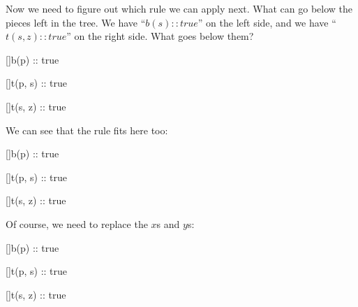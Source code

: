 \documentclass[../../../main.tex]{subfiles}
\begin{document}
\noindent
Now we need to figure out which rule we can apply next. What can go below the pieces left in the tree. We have ``$b(s) :: true$'' on the left side, and we have ``$t(s, z) :: true$'' on the right side. What goes below them?

\begin{prooftree*}
  \hypo{}
  []{b(p) :: true}

  \hypo{}
  []{t(p, s) :: true}


  \ellipsis{}{}
    
  \hypo{}
  []{t(s, z) :: true}
  \ellipsis{}{}

  
\end{prooftree*}

\noindent
We can see that the  rule fits here too:

\begin{prooftree*}
  \hypo{}
  []{b(p) :: true}
  
  \hypo{}
  []{t(p, s) :: true}

    
  \hypo{}
  []{t(s, z) :: true}

  
\end{prooftree*}

\noindent
Of course, we need to replace the $x$s and $y$s:

\begin{prooftree*}
  \hypo{}
  []{b(p) :: true}
  
  \hypo{}
  []{t(p, s) :: true}

    
  \hypo{}
  []{t(s, z) :: true}

  
\end{prooftree*}
\end{document}
